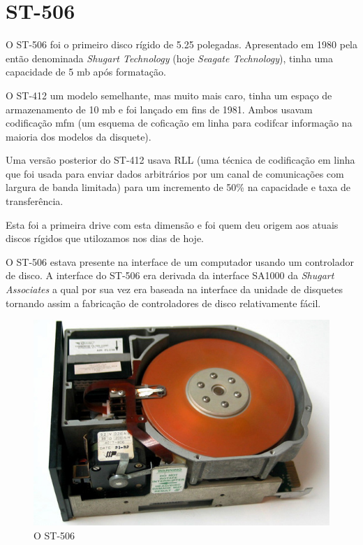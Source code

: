 \documentclass{report}
\begin{document}
\newpage
		
		\section{ST-506}

	O ST-506 foi o primeiro disco rígido de 5.25 polegadas. Apresentado em 1980 pela então denominada \textit{Shugart Technology} (hoje \textit{Seagate Technology}), tinha uma capacidade de 5 \ac{mb} após formatação. 
\vspace{1mm}

	O ST-412 um modelo semelhante, mas muito mais caro, tinha um espaço de armazenamento de 10 \ac{mb} e foi lançado em fins de 1981. Ambos usavam codificação \ac{mfm} (um esquema de coficação em linha para codifcar informação na maioria dos modelos da disquete).
\vspace{1mm}
	
	Uma versão posterior do ST-412 usava RLL (uma técnica de codificação em linha que foi usada para enviar dados arbitrários por um canal de comunicações com largura de banda limitada) para um incremento de 50\% na capacidade e taxa de transferência.
\vspace{1mm}
	
	Esta foi a primeira drive com esta dimensão e foi quem deu origem aos atuais discos rígidos que utilozamos nos dias de hoje.
\vspace{1mm}

	O ST-506 estava presente na interface de um computador usando um controlador de disco. A interface do ST-506 era derivada da interface SA1000 da \textit{Shugart Associates}  a qual por sua vez era baseada na interface da unidade de disquetes tornando assim a fabricação de controladores de disco relativamente fácil.
\vspace{1mm}

	\begin{figure} [h]
		\centering
		\includegraphics[scale=0.3]{st-506.jpg}
		\caption{O ST-506}
	\end{figure}		
\newpage
\end{document}
